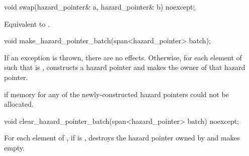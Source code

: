 %
\begin{itemdecl}
void swap(hazard_pointer& a, hazard_pointer& b) noexcept;
\end{itemdecl}

\begin{itemdescr}
\pnum
\effects
Equivalent to .
\end{itemdescr}

%
\begin{itemdecl}
void make_hazard_pointer_batch(span<hazard_pointer> batch);
\end{itemdecl}

\begin{itemdescr}
\pnum
\effects
If an exception is thrown, there are no effects.
Otherwise, for each element  of 
such that  is ,
constructs a hazard pointer and makes 
the owner of that hazard pointer.

\pnum
\throws
{} if memory for any of the newly-constructed hazard pointers
could not be allocated.
\end{itemdescr}

%
\begin{itemdecl}
void clear_hazard_pointer_batch(span<hazard_pointer> batch) noexcept;
\end{itemdecl}

\begin{itemdescr}
\pnum
\effects
For each element  of ,
if  is ,
destroys the hazard pointer owned by  and
makes  empty.
\end{itemdescr}
